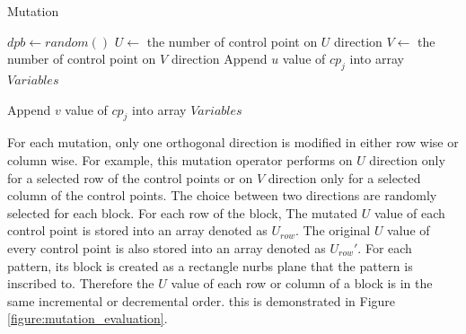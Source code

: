 \begin{algorithm}
\caption{Mutation}\label{algorithm:mutation}
\begin{algorithmic}[1]
		\State $dpb \gets random()$
		\State $U \gets$ the number of control point on $U$ direction		
		\State $V \gets$ the number of control point on $V$ direction	
		 			
				\State Append $u$ value of $cp_{j}$ into array $Variables$
			\EndFor
			\EndIf
			\EndFor				
				
		\Else	{}
				\State Append $v$ value of $cp_{j}$ into array $Variables$
			\EndFor
			\EndIf
			\EndFor	
		\EndIf		
	\EndFor
	\EndIf
\EndProcedure
\end{algorithmic}
\end{algorithm}

For each mutation, only one orthogonal direction is modified in either row wise or column wise. For example, this mutation operator performs on $U$ direction only for a selected row of the control points or on $V$ direction only for a selected column of the control points. The choice between two directions are randomly selected for each block. For each row of the block, The mutated $U$ value of each control point is stored into an array denoted as $U_{row}$. The original $U$ value of every control point is also stored into an array denoted as $U_{row}'$. For each pattern, its block is created as a rectangle nurbs plane that the pattern is inscribed to. Therefore the $U$ value of  each row or column of a block is in the same incremental or decremental order. this is demonstrated in Figure \ref{figure:mutation_evaluation}.

